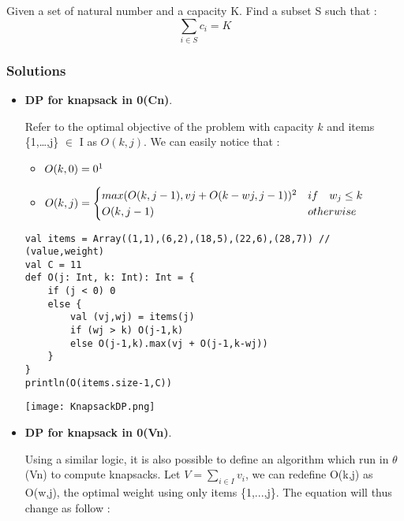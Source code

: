 Given a set of natural number and a capacity K. 
Find a subset S such that :
$$\sum_{i \in S} c_i = K$$


\subsubsection{Solutions}
\begin{itemize}
    \item \textbf{DP for knapsack in 0(Cn)}.

        Refer to the optimal objective of the problem with capacity $k$ and
        items \{1,…,j\} $\in$ I as $O(k,j)$. We can easily notice that :

        \begin{itemize}
            \item $O(k,0) = 0 \text{\footnotemark}$
            \item $ O(k,j) = \begin{cases} 
                    max(O(k,j-1) , vj +O(k-wj,j-1))\text{\footnotemark} & if \quad w_j \leq k \\
                    O(k,j-1) & otherwise
                \end{cases}$
        \end{itemize}


        \begin{lstlisting}[caption=Knapsack DP]
val items = Array((1,1),(6,2),(18,5),(22,6),(28,7)) // (value,weight)
val C = 11
def O(j: Int, k: Int): Int = {
    if (j < 0) 0
    else {
        val (vj,wj) = items(j)
        if (wj > k) O(j-1,k)
        else O(j-1,k).max(vj + O(j-1,k-wj))
    }
}
println(O(items.size-1,C))
        \end{lstlisting}

        \begin{center}
    \texttt{[image: KnapsackDP.png]}
        \end{center}

    \item \textbf{DP for knapsack in 0(Vn)}.

        Using a similar logic, it is also possible to define an algorithm which
        run in $\theta$(Vn) to compute knapsacks. Let $V = \sum_{i \in I} v_i$,
        we can redefine O(k,j) as O(w,j), the optimal weight using only items
        \{1,...,j\}. The equation will thus change as follow :


\end{itemize}

